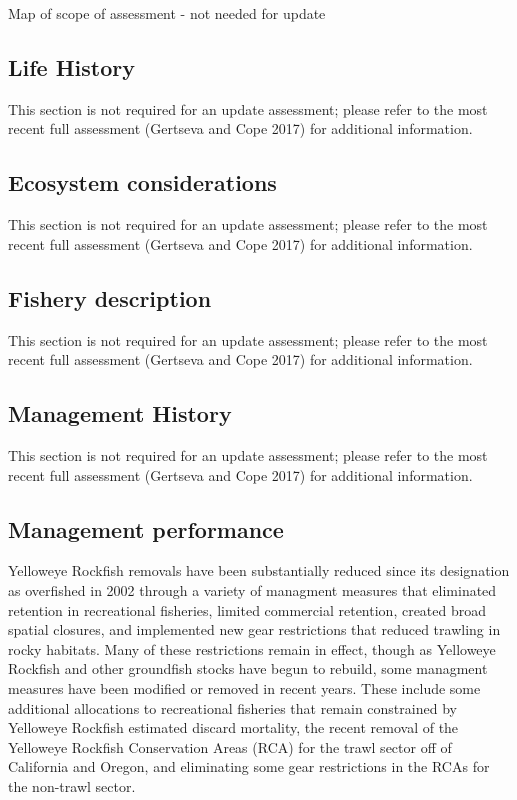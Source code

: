 \documentclass[
]{scrartcl}
\begin{document}
Map of scope of assessment - not needed for update

\subsection{Life History}\label{life-history}

This section is not required for an update assessment; please refer to
the most recent full assessment (Gertseva and Cope 2017) for additional
information.

\subsection{Ecosystem considerations}\label{ecosystem-considerations-1}

This section is not required for an update assessment; please refer to
the most recent full assessment (Gertseva and Cope 2017) for additional
information.

\subsection{Fishery description}\label{fishery-description}

This section is not required for an update assessment; please refer to
the most recent full assessment (Gertseva and Cope 2017) for additional
information.

\subsection{Management History}\label{management-history}

This section is not required for an update assessment; please refer to
the most recent full assessment (Gertseva and Cope 2017) for additional
information.

\subsection{Management performance}\label{management-performance-1}

Yelloweye Rockfish removals have been substantially reduced since its
designation as overfished in 2002 through a variety of managment
measures that eliminated retention in recreational fisheries, limited
commercial retention, created broad spatial closures, and implemented
new gear restrictions that reduced trawling in rocky habitats. Many of
these restrictions remain in effect, though as Yelloweye Rockfish and
other groundfish stocks have begun to rebuild, some managment measures
have been modified or removed in recent years. These include some
additional allocations to recreational fisheries that remain constrained
by Yelloweye Rockfish estimated discard mortality, the recent removal of
the Yelloweye Rockfish Conservation Areas (RCA) for the trawl sector off
of California and Oregon, and eliminating some gear restrictions in the
RCAs for the non-trawl sector.
\end{document}

